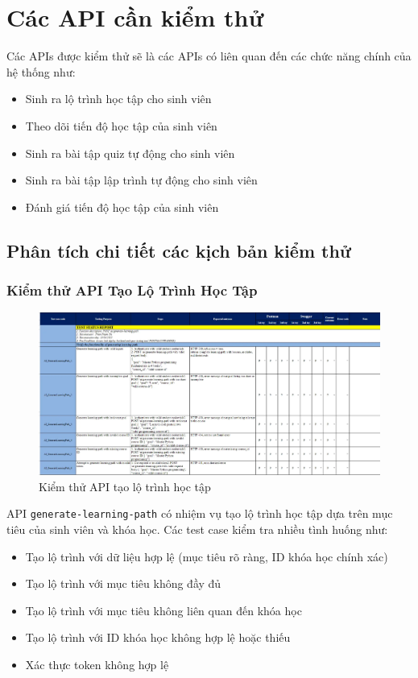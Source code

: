 \section{Các API cần kiểm thử}
Các APIs được kiểm thử sẽ là các APIs có liên quan đến các chức năng chính của hệ thống như:
\begin{itemize}
	\item Sinh ra lộ trình học tập cho sinh viên
	\item Theo dõi tiến độ học tập của sinh viên
	\item Sinh ra bài tập quiz tự động cho sinh viên
	\item Sinh ra bài tập lập trình tự động cho sinh viên
	\item Đánh giá tiến độ học tập của sinh viên
\end{itemize}
\subsection{Phân tích chi tiết các kịch bản kiểm thử}

\subsubsection{Kiểm thử API Tạo Lộ Trình Học Tập}
\begin{figure}[H]
	\centering
	\includegraphics[width=0.8\linewidth]{images/test/test_S1G13.png}
	\caption{Kiểm thử API tạo lộ trình học tập}
	\label{fig:testing_learning_path}
\end{figure}
API \texttt{generate-learning-path} có nhiệm vụ tạo lộ trình học tập dựa trên mục tiêu của sinh viên và khóa học. Các test case kiểm tra nhiều tình huống như:
\begin{itemize}
    \item Tạo lộ trình với dữ liệu hợp lệ (mục tiêu rõ ràng, ID khóa học chính xác)
    \item Tạo lộ trình với mục tiêu không đầy đủ
    \item Tạo lộ trình với mục tiêu không liên quan đến khóa học
    \item Tạo lộ trình với ID khóa học không hợp lệ hoặc thiếu
    \item Xác thực token không hợp lệ
\end{itemize}

